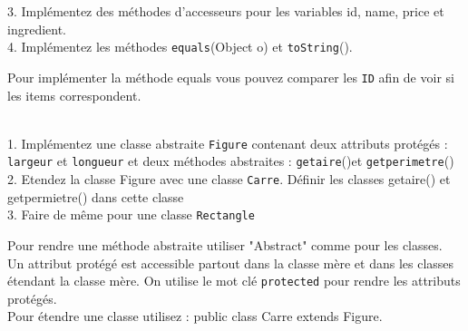 \begin{Exercice}[10 minutes]
3. Implémentez des méthodes d'accesseurs pour les variables id, name, price et ingredient.\\

4. Implémentez les méthodes \lstinline{equals}(Object o) et \lstinline{toString}().

\begin{conseil}
Pour implémenter la méthode equals vous pouvez comparer les \lstinline{ID} afin de voir si les items correspondent.
\end{conseil}

    \begin{solution}
 \begin{itemize}
             
    \end{itemize}
    \end{solution}
\end{Exercice}


\begin{Exercice}[10 minutes]\\
1. Implémentez une classe abstraite \lstinline{Figure} contenant deux attributs protégés : \lstinline{largeur} et \lstinline{longueur} et deux méthodes abstraites : \lstinline{getaire}()et \lstinline{getperimetre}()\\
2. Etendez la classe Figure avec une classe \lstinline{Carre}. Définir les classes getaire() et getpermietre() dans cette classe\\
3. Faire de même pour une classe \lstinline{Rectangle}\\

\begin{conseil}
    Pour rendre une méthode abstraite utiliser "Abstract" comme pour les classes.\\
    Un attribut protégé est accessible partout dans la classe mère et dans les classes étendant la classe mère. On utilise le mot clé \lstinline{protected} pour rendre les attributs protégés. \\
    Pour étendre une classe utilisez : public class Carre extends Figure. 
\end{conseil}



    \begin{solution}
 \begin{itemize}
 
    \end{itemize}
    \end{solution}
\end{Exercice}

